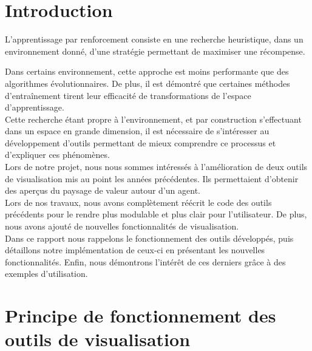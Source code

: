 \documentclass[12pt]{article}
\begin{document}
\newpage																		
\renewcommand*\contentsname{Table des Matières}
\tableofcontents 

\newpage
\setlength{\parindent}{2ex}

\section*{Introduction}

L’apprentissage par renforcement consiste en une recherche heuristique, dans un environnement donné, d’une stratégie permettant de maximiser une récompense. \par

Dans certains environnement, cette approche est moins performante que des algorithmes évolutionnaires. De plus, il est démontré que certaines méthodes d’entraînement tirent leur efficacité de transformations de l’espace d’apprentissage. \\

Cette recherche étant propre à l’environnement, et par construction s’effectuant dans un espace en grande dimension, il est nécessaire de s’intéresser au développement d’outils permettant de mieux comprendre ce processus et d’expliquer ces phénomènes. \\

Lors de notre projet, nous nous sommes intéressés à l’amélioration de deux outils de visualisation mis au point les années précédentes. Ils permettaient d’obtenir des aperçus du paysage de valeur autour d’un agent. \\

Lors de nos travaux, nous avons complètement réécrit le code des outils précédents pour le rendre plus modulable et plus clair pour l’utilisateur. De plus, nous avons ajouté de nouvelles fonctionnalités de visualisation. \\

Dans ce rapport nous rappelons le fonctionnement des outils développés, puis détaillons notre implémentation de ceux-ci en présentant les nouvelles fonctionnalités. Enfin, nous démontrons l'intérêt de ces derniers grâce à des exemples d'utilisation. \\

\newpage
\section{Principe de fonctionnement des outils de visualisation}
\end{document}
